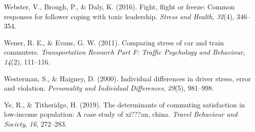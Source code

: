 \documentclass[
11pt, %
oneside, %
english, %
singlespacing, %
]{macthesis} %
\newlength{\cslhangindent}
\newenvironment{CSLReferences}[2] %
 {%
  \setlength{\parindent}{0pt}
  \ifodd #1 \everypar{\setlength{\hangindent}{\cslhangindent}}\ignorespaces\fi
  \ifnum #2 > 0
  \setlength{\parskip}{#2\baselineskip}
  \fi
 }%
 {}
\begin{document}
\begin{CSLReferences}{1}{0}
\leavevmode{}%
Webster, V., Brough, P., \& Daly, K. (2016). Fight, flight or freeze: Common responses for follower coping with toxic leadership. \emph{Stress and Health}, \emph{32}(4), 346--354.

\leavevmode{}%
Wener, R. E., \& Evans, G. W. (2011). Comparing stress of car and train commuters. \emph{Transportation Research Part F: Traffic Psychology and Behaviour}, \emph{14}(2), 111--116.

\leavevmode{}%
Westerman, S., \& Haigney, D. (2000). Individual differences in driver stress, error and violation. \emph{Personality and Individual Differences}, \emph{29}(5), 981--998.

\leavevmode{}%
Ye, R., \& Titheridge, H. (2019). The determinants of commuting satisfaction in low-income population: A case study of xi???an, china. \emph{Travel Behaviour and Society}, \emph{16}, 272--283.

\end{CSLReferences}
\end{document}
